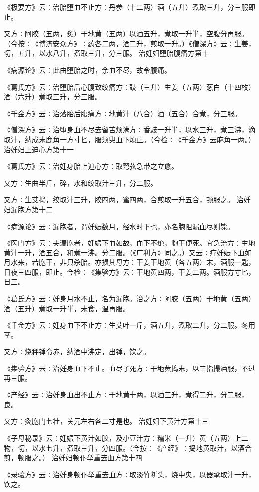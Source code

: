 \documentclass[a4paper,12pt,UTF8,twoside]{ctexbook}
\begin{document}
《极要方》云∶治胎堕血不止方∶丹参（十二两）酒（五升）煮取三升，分三服即止。

又方∶阿胶（五两，炙）干地黄（五两）以酒五升，煮取一升半，空腹分再服。（今按∶《博济安众方》∶药各二两，酒二升，煎取一升。）《僧深方》云∶生姜，切，五升，以水八升，煮取三升，分三服。
治妊妇堕胎腹痛方第十

《病源论》云∶此由堕胎之时，余血不尽，故令腹痛。

《葛氏方》云∶治堕胎后心腹致绞痛方∶豉（三升）生姜（五两）葱白（十四枚）酒（六升）煮取三升，分三服。

《千金方》云∶治落胎后腹痛方∶地黄汁（八合）酒（五合）合煮，分三服。

《僧深方》云∶治堕身血不尽去留苦烦满方∶香豉一升半，以水三升，煮三沸，滴取汁，纳成末鹿角一方寸匕，服须臾血下烦止。（今检∶《千金方》云麻角一两。）
治妊妇上迫心方第十一

《葛氏方》云∶治妊身胎上迫心方∶取弩弦急带之立愈。

又方∶生曲半斤，碎，水和绞取汁三升，分二服。

又方∶生艾捣，绞取汁三升，胶四两，蜜四两，合煎取一升五合，顿服之。
治妊妇漏胞方第十二

《病源论》云∶漏胞者，谓妊娠数月，经水时下也，亦名胞阻漏血尽则毙。

《医门方》云∶夫漏胞者，妊娠下血如故，血下不绝，胞干便死。宜急治方∶生地黄汁一升，酒五合，和煮一沸。分二服。（《广利方》同之。）又云∶疗妊娠下血如月水来，若胞干，非只杀胎。亦损其母方∶干姜干地黄（各五两）末，酒服一匙，日夜三四服，即止。今检∶《集验方》云∶干地黄四两，干姜二两。酒服方寸匕，日三。

《葛氏方》云∶妊身月水不止，名为漏胞。治之方∶阿胶（五两）干地黄（五两）酒（五升）煮取一升半，未食，温再服。

《千金方》云∶妊身血下不止方∶生艾叶一斤，酒五升，煮取二升，分二服。冬用茎。

又方∶烧秤锤令赤，纳酒中沸定，出锤，饮之。

《集验方》云∶治妊身血下不止。血尽子死方∶干地黄捣末，以三指撮酒服，不过再三服。

《产经》云∶治妊身血出不止方∶干地黄十两，以酒三升，煮得二升，分二服，良。

又方∶灸胞门七壮，关元左右各二寸是也。
治妊妇下黄汁方第十三

《子母秘录》云∶妊娠下黄汁如胶，及小豆汁方∶糯米（一升）黄（五两）上二物，切，以水七升，煮取三升，分四服。（今按∶《产经》∶捣地黄取汁，以酒合煎，顿服之。）
治妊妇顿仆举重去血方第十四

《录验方》云∶治妊身顿仆举重去血方∶取淡竹断头，烧中央，以器承取汁一升，饮之。
\end{document}
